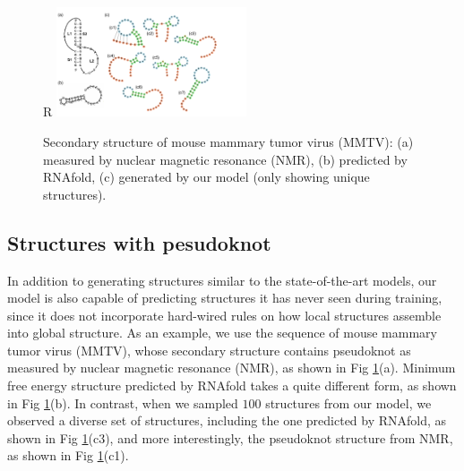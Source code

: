 \documentclass{article}
\begin{document}
\begin{figure}{R}
    \centering
    \vspace{-3em}
    \includegraphics[width=0.5\textwidth]{plot/sample_structure_pseudoknot.pdf}
    \caption{Secondary structure of mouse mammary tumor virus (MMTV): (a) measured by nuclear magnetic resonance (NMR)\cite{staple2005pseudoknots}, (b) predicted by RNAfold, (c) generated by our model (only showing unique structures).}
    \vspace{-3em}
    \label{fig:sample_structure_pseudoknot}
    \centering
\end{figure}





\subsection{Structures with pesudoknot}

In addition to generating structures similar to the state-of-the-art models,
our model is also capable of predicting structures it has never seen during training,
since it does not incorporate hard-wired rules on how local structures assemble into global structure.
As an example, we use the sequence of mouse mammary tumor virus (MMTV), whose secondary structure
contains pseudoknot as measured by nuclear magnetic resonance (NMR), as shown in Fig \ref{fig:sample_structure_pseudoknot}(a).
Minimum free energy structure predicted by RNAfold takes a quite different form, as shown in Fig \ref{fig:sample_structure_pseudoknot}(b).
In contrast, when we sampled $100$ structures from our model, we observed a diverse set of structures,
including the one predicted by RNAfold, as shown in Fig \ref{fig:sample_structure_pseudoknot}(c3),
and more interestingly, the pseudoknot structure from NMR, as shown in Fig \ref{fig:sample_structure_pseudoknot}(c1).
\end{document}
